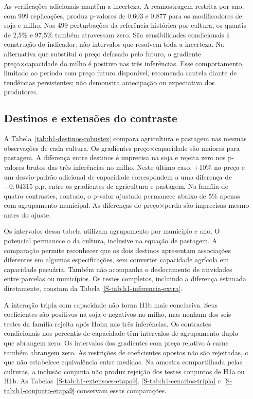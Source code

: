 As verificações adicionais mantêm a incerteza. A reamostragem restrita por ano, com 999 replicações, produz p-valores de 0,603 e 0,877 para os modificadores de soja e milho. Nas 499 perturbações da referência histórica por cultura, os quantis de 2,5\% e 97,5\% também atravessam zero. São sensibilidades condicionais à construção do indicador, não intervalos que resolvem toda a incerteza. Na alternativa que substitui o preço defasado pelo futuro, o gradiente preço×capacidade do milho é positivo nas três inferências. Esse comportamento, limitado ao período com preço futuro disponível, recomenda cautela diante de tendências persistentes; não demonstra antecipação ou expectativa dos produtores.

\subsection{Destinos e extensões do contraste}

A Tabela~\ref{tab:h1-destinos-robustez} compara agricultura e pastagem nas mesmas observações de cada cultura. Os gradientes preço×capacidade são maiores para pastagem. A diferença entre destinos é imprecisa na soja e rejeita zero nos p-valores brutos das três inferências no milho. Neste último caso, +10\% no preço e um desvio-padrão adicional de capacidade correspondem a uma diferença de $-0,04315$ p.p. entre os gradientes de agricultura e pastagem. Na família de quatro contrastes, contudo, o p-valor ajustado permanece abaixo de 5\% apenas com agrupamento municipal. As diferenças de preço×perda são imprecisas mesmo antes do ajuste.


\FloatBarrier

Os intervalos dessa tabela utilizam agrupamento por município e ano. O potencial permanece o da cultura, inclusive na equação de pastagem. A comparação permite reconhecer que os dois destinos apresentam associações diferentes em algumas especificações, sem converter capacidade agrícola em capacidade pecuária. Também não acompanha o deslocamento de atividades entre parcelas ou municípios. Os testes completos, incluindo a diferença estimada diretamente, constam da Tabela~\ref{S-tab:h1-inferencia-extra}.

A interação tripla com capacidade não torna H1b mais conclusiva. Seus coeficientes são positivos na soja e negativos no milho, mas nenhum dos seis testes da família rejeita após Holm nas três inferências. Os contrastes condicionais nos percentis de capacidade têm intervalos de agrupamento duplo que abrangem zero. Os intervalos dos gradientes com preço relativo à carne também abrangem zero. As restrições de coeficientes opostos não são rejeitadas, o que não estabelece equivalência entre medidas. Na amostra compartilhada pelas culturas, a inclusão conjunta não produz rejeição dos testes conjuntos de H1a ou H1b. As Tabelas~\ref{S-tab:h1-extensoes-etapa9}, \ref{S-tab:h1-cenarios-tripla} e~\ref{S-tab:h1-conjunto-etapa9} conservam essas comparações.

